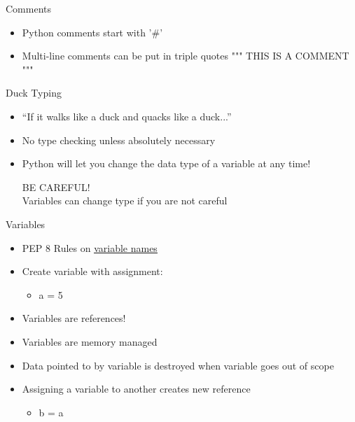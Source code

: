 % 
% 
% 
\begin{Slide}{Comments}
  \begin{itemize}
  \item Python comments start with '\#'
  \item Multi-line comments can be put in triple quotes  """ THIS IS A COMMENT """ 
  \end{itemize}
\end{Slide}

% 
% 
% 
\begin{Slide}{Duck Typing}
  \begin{itemize}
  \item “If it walks like a duck and quacks like a duck...”
  \item No type checking unless absolutely necessary
  \item Python will let you change the data type of a variable at any time!
    \pause
    \begin{tcolorbox}[colback=red!5!white,colframe=red!75!black,title=WARNING]
      BE CAREFUL! \\
      Variables can change type if you are not careful
    \end{tcolorbox}
    
  \end{itemize}
\end{Slide}



% 
% 
% 
\begin{Slide}{Variables}
  \begin{itemize}
  \item PEP 8 Rules on \underline{\href{https://www.python.org/dev/peps/pep-0008/\#global-variable-names}{variable names}}
  \item Create variable with assignment:
    \begin{itemize}
    \item  a = 5
    \end{itemize}
    
  \item Variables are references!
  \item Variables are memory managed
  \item Data pointed to by variable is destroyed when variable goes out of scope
  \item Assigning a variable to another creates new reference
    \begin{itemize}
    \item b = a
    \end{itemize}
  \end{itemize}

\end{Slide}


